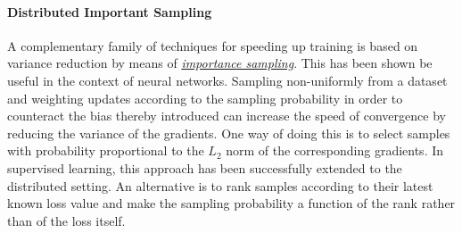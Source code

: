 \paragraph{Distributed Important Sampling} A complementary family of techniques for speeding up training is based on variance reduction by means of \textit{\uline{importance sampling}}. This has been shown be useful in the context of neural networks. Sampling non-uniformly from a dataset and weighting updates according to the sampling probability in order to counteract the bias thereby introduced can increase the speed of convergence by reducing the variance of the gradients. One way of doing this is to select samples with probability proportional to the $L_{2}$ norm of the corresponding gradients. In supervised learning, this approach has been successfully extended to the distributed setting. An alternative is to rank samples according to their latest known loss value and make the sampling probability a function of the rank rather than of the loss itself.